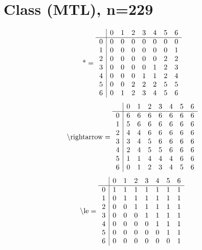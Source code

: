 \documentclass[11pt]{article}
\begin{document}
\section{Class (MTL), n=229}
\[\text{*} = 
\begin{array}{r | r r r r r r r}
 & 0 & 1 & 2 & 3 & 4 & 5 & 6 \\ \hline
0 & 0 & 0 & 0 & 0 & 0 & 0 & 0 \\
1 & 0 & 0 & 0 & 0 & 0 & 0 & 1 \\
2 & 0 & 0 & 0 & 0 & 0 & 2 & 2 \\
3 & 0 & 0 & 0 & 0 & 1 & 2 & 3 \\
4 & 0 & 0 & 0 & 1 & 1 & 2 & 4 \\
5 & 0 & 0 & 2 & 2 & 2 & 5 & 5 \\
6 & 0 & 1 & 2 & 3 & 4 & 5 & 6 \\
\end{array}
\]
\[\text{\textbackslash rightarrow} = 
\begin{array}{r | r r r r r r r}
 & 0 & 1 & 2 & 3 & 4 & 5 & 6 \\ \hline
0 & 6 & 6 & 6 & 6 & 6 & 6 & 6 \\
1 & 5 & 6 & 6 & 6 & 6 & 6 & 6 \\
2 & 4 & 4 & 6 & 6 & 6 & 6 & 6 \\
3 & 3 & 4 & 5 & 6 & 6 & 6 & 6 \\
4 & 2 & 4 & 5 & 5 & 6 & 6 & 6 \\
5 & 1 & 1 & 4 & 4 & 4 & 6 & 6 \\
6 & 0 & 1 & 2 & 3 & 4 & 5 & 6 \\
\end{array}
\]
\[\text{\textbackslash le} = 
\begin{array}{r | r r r r r r r}
 & 0 & 1 & 2 & 3 & 4 & 5 & 6 \\ \hline
0 & 1 & 1 & 1 & 1 & 1 & 1 & 1 \\
1 & 0 & 1 & 1 & 1 & 1 & 1 & 1 \\
2 & 0 & 0 & 1 & 1 & 1 & 1 & 1 \\
3 & 0 & 0 & 0 & 1 & 1 & 1 & 1 \\
4 & 0 & 0 & 0 & 0 & 1 & 1 & 1 \\
5 & 0 & 0 & 0 & 0 & 0 & 1 & 1 \\
6 & 0 & 0 & 0 & 0 & 0 & 0 & 1 \\
\end{array}
\]
\end{document}
